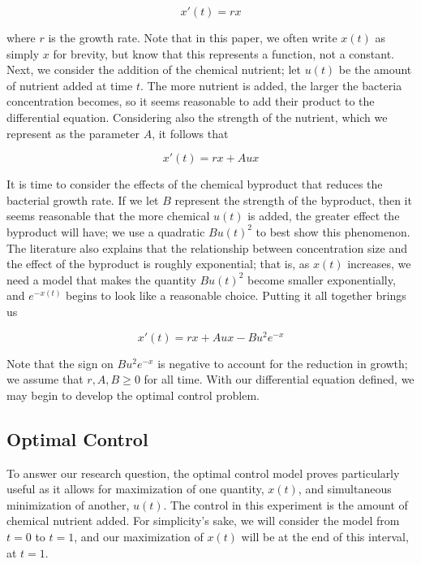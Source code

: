 \documentclass[10pt]{article}
\theoremstyle{exmp}
\begin{document}
\begin{equation}
    x'(t) = rx \label{1}
\end{equation}

 \noindent where $r$ is the growth rate. Note that in this paper, we often write $x(t)$ as simply $x$ for brevity, but know that this represents a function, not a constant. Next, we consider the addition of the chemical nutrient; let $u(t)$ be the amount of nutrient added at time $t$. The more nutrient is added, the larger the bacteria concentration becomes, so it seems reasonable to add their product to the differential equation. Considering also the strength of the nutrient, which we represent as the parameter $A$, it follows that

 \begin{equation}
     x'(t) = rx + Aux
 \end{equation}
 
\noindent It is time to consider the effects of the chemical byproduct that reduces the bacterial growth rate. If we let $B$ represent the strength of the byproduct, then it seems reasonable that the more chemical $u(t)$ is added, the greater effect the byproduct will have; we use a quadratic $Bu(t)^2$ to best show this phenomenon. The literature also explains that the relationship between concentration size and the effect of the byproduct is roughly exponential; that is, as $x(t)$ increases, we need a model that makes the quantity $Bu(t)^2$ become smaller exponentially, and $e^{-x(t)}$ begins to look like a reasonable choice. Putting it all together brings us

\begin{equation}
    x'(t) = rx + Aux - Bu^2e^{-x}
\end{equation}

\noindent Note that the sign on $Bu^2e^{-x}$ is negative to account for the reduction in growth; we assume that $r,A,B \geq 0$ for all time. With our differential equation defined, we may begin to develop the optimal control problem.

\subsection{Optimal Control}
\label{optimalcontrol}

To answer our research question, the optimal control model proves particularly useful as it allows for maximization of one quantity, $x(t)$, and simultaneous minimization of another, $u(t)$. The control in this experiment is the amount of chemical nutrient added. For simplicity's sake, we will consider the model from $t = 0$ to $t = 1$, and our maximization of $x(t)$ will be at the end of this interval, at $t = 1$. \\
\end{document}

